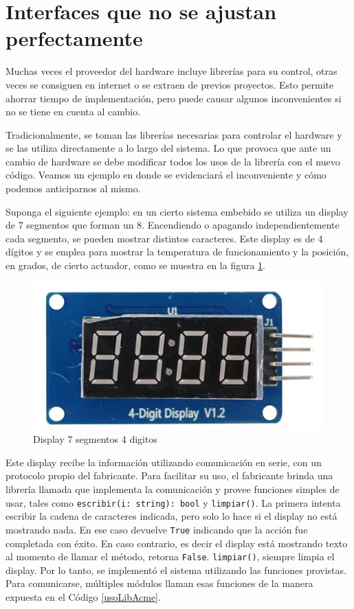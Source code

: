 \section{Interfaces que no se ajustan perfectamente}
Muchas veces el proveedor del hardware incluye librerías para su control, otras veces se consiguen en internet o se extraen de previos proyectos. Esto permite ahorrar tiempo de implementación, pero puede causar algunos inconvenientes si no se tiene en cuenta al cambio.

Tradicionalmente, se toman las librerías necesarias para controlar el hardware y se las utiliza directamente a lo largo del sistema. Lo que provoca que ante un cambio de hardware se debe modificar todos los usos de la librería con el nuevo código. Veamos un ejemplo en donde se evidenciará el inconveniente y cómo podemos anticiparnos al mismo.

Suponga el siguiente ejemplo: en un cierto sistema embebido se utiliza un display de 7 segmentos que forman un 8. Encendiendo o apagando independientemente cada segmento, se pueden mostrar distintos caracteres. Este display es de 4 dígitos y se emplea para mostrar la temperatura de funcionamiento y la posición, en grados, de cierto actuador, como se muestra en la figura \ref{fig:enter-label}.

\begin{figure}[h]
    \centering
    \includegraphics[width=0.4\linewidth]{display.png}
    \caption{Display 7 segmentos 4 digitos}
    \label{fig:enter-label}
\end{figure}


Este display recibe la información utilizando comunicación en serie, con un protocolo propio del fabricante. Para facilitar su uso, el fabricante brinda una librería llamada \LibAcme que implementa la comunicación y provee funciones simples de usar, tales como \verb|escribir(i: string): bool| y \verb|limpiar()|. La primera intenta escribir la cadena de caracteres indicada, pero solo lo hace si el display no está mostrando nada. En ese caso devuelve \verb|True| indicando que la acción fue completada con éxito. En caso contrario, es decir el display está mostrando texto al momento de llamar el método, retorna \verb|False|. \verb|limpiar()|, siempre limpia el display. Por lo tanto, se implementó el sistema utilizando las funciones provistas. Para comunicarse, múltiples módulos llaman esas funciones de la manera expuesta en el Código \ref{usoLibAcme}.

